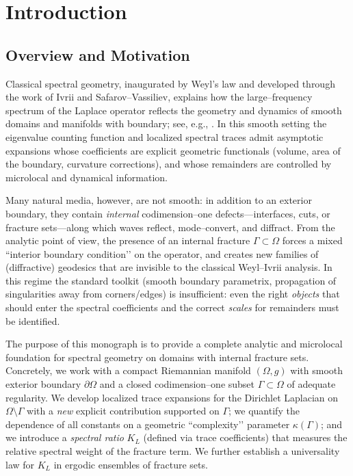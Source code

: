 
\chapter{Introduction}
\label{chap:introduction}

\section{Overview and Motivation}

Classical spectral geometry, inaugurated by Weyl’s law and developed through 
the work of Ivrii and Safarov–Vassiliev, explains how the large–frequency 
spectrum of the Laplace operator reflects the geometry and dynamics of smooth 
domains and manifolds with boundary; see, e.g., \cite{weyl1911,ivrii1980,
safarov-vassiliev1997}. In this smooth setting the eigenvalue counting function 
and localized spectral traces admit asymptotic expansions whose coefficients 
are explicit geometric functionals (volume, area of the boundary, curvature 
corrections), and whose remainders are controlled by microlocal and dynamical 
information.

Many natural media, however, are not smooth: in addition to an exterior 
boundary, they contain \emph{internal} codimension–one defects—interfaces, 
cuts, or fracture sets—along which waves reflect, mode–convert, and diffract. 
From the analytic point of view, the presence of an internal fracture 
$\Gamma\subset\Omega$ forces a mixed “interior boundary condition’’ on the 
operator, and creates new families of (diffractive) geodesics that are 
invisible to the classical Weyl–Ivrii analysis. In this regime the standard 
toolkit (smooth boundary parametrix, propagation of singularities away from 
corners/edges) is insufficient: even the right \emph{objects} that should enter 
the spectral coefficients and the correct \emph{scales} for remainders must be 
identified.

The purpose of this monograph is to provide a complete analytic and microlocal 
foundation for spectral geometry on domains with internal fracture sets. 
Concretely, we work with a compact Riemannian manifold $(\Omega,g)$ with smooth 
exterior boundary $\partial\Omega$ and a closed codimension–one subset 
$\Gamma\subset\Omega$ of adequate regularity. We develop localized trace 
expansions for the Dirichlet Laplacian on $\Omega\setminus\Gamma$ with a 
\emph{new} explicit contribution supported on $\Gamma$; we quantify the 
dependence of all constants on a geometric “complexity’’ parameter 
$\kappa(\Gamma)$; and we introduce a \emph{spectral ratio} $K_L$ (defined via 
trace coefficients) that measures the relative spectral weight of the fracture 
term. We further establish a universality law for $K_L$ in ergodic ensembles of 
fracture sets.


